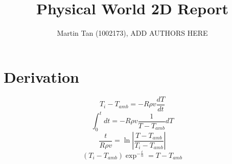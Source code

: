 \documentclass[12pt,a4paper]{IEEEtran}
\author{Martin Tan (1002173), ADD AUTHORS HERE}
\title{Physical World 2D Report}
\begin{document}
	\maketitle
	\section{Derivation}
	$$T_i - T_{amb} = -R \rho v \frac{dT}{dt}$$
	$$\int_{0}^{t} dt = -R \rho v \frac{1}{T-T_{amb}} dT$$
	$$\frac{t}{R \rho v} = \ln \left| \frac{T - T_{amb}}{T_i - T_{amb}} \right|$$
	$$\left( T_i - T_{amb} \right) \exp^{-\frac{t}{\alpha}} = T - T_{amb}$$
\end{document}
